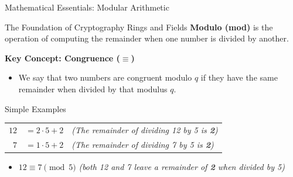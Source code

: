 \documentclass[aspectratio=169, 10pt]{beamer}
\begin{document}
\begin{frame}{Mathematical Essentials: Modular Arithmetic}
    \begin{block}{The Foundation of Cryptography Rings and Fields}
        \textbf{Modulo (mod)} is the operation of computing the remainder when one number is divided by another.
    \end{block}

    \vspace{0.4cm}
    \textbf{Key Concept: Congruence ($\equiv$)}
    \begin{itemize}
        \item We say that two numbers are congruent modulo $q$ if they have the same remainder when divided by that modulus $q$.
    \end{itemize}

    \vspace{0.4cm}
\begin{exampleblock}{Simple Examples}
    \vspace{0.2cm}
    \begin{tabular}{r@{\;}l l}
        $12$ & $= 2 \cdot 5 + 2$ & \textit{(The remainder of dividing 12 by 5 is \textbf{2})} \\
        $7$  & $= 1 \cdot 5 + 2$ & \textit{(The remainder of dividing 7 by 5 is \textbf{2})}
    \end{tabular}
    
    \vspace{0.2cm}
    \begin{itemize}
        \item $12 \equiv 7 \pmod 5$ \textit{(both 12 and 7 leave a remainder of \textbf{2} when divided by 5)}
    \end{itemize}
\end{exampleblock}
\end{frame}
\end{document}
